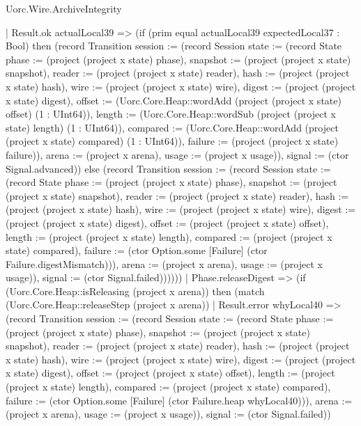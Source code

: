 \begin{lexlean}{Uorc.Wire.ArchiveIntegrity}
\begin{semanticmodule}
{          | Result.ok actualLocal39 => (if (prim equal actualLocal39 expectedLocal37 : Bool) then (record Transition {session := (record Session {state := (record State {phase := (project (project x state) phase), snapshot := (project (project x state) snapshot), reader := (project (project x state) reader), hash := (project (project x state) hash), wire := (project (project x state) wire), digest := (project (project x state) digest), offset := (Uorc.Core.Heap::wordAdd (project (project x state) offset) (1 : UInt64)), length := (Uorc.Core.Heap::wordSub (project (project x state) length) (1 : UInt64)), compared := (Uorc.Core.Heap::wordAdd (project (project x state) compared) (1 : UInt64)), failure := (project (project x state) failure)}), arena := (project x arena), usage := (project x usage)}), signal := (ctor Signal.advanced)}) else (record Transition {session := (record Session {state := (record State {phase := (project (project x state) phase), snapshot := (project (project x state) snapshot), reader := (project (project x state) reader), hash := (project (project x state) hash), wire := (project (project x state) wire), digest := (project (project x state) digest), offset := (project (project x state) offset), length := (project (project x state) length), compared := (project (project x state) compared), failure := (ctor Option.some [Failure] (ctor Failure.digestMismatch))}), arena := (project x arena), usage := (project x usage)}), signal := (ctor Signal.failed)})))))
      | Phase.releaseDigest => (if (Uorc.Core.Heap::isReleasing (project x arena)) then (match (Uorc.Core.Heap::releaseStep (project x arena))
        | Result.error whyLocal40 => (record Transition {session := (record Session {state := (record State {phase := (project (project x state) phase), snapshot := (project (project x state) snapshot), reader := (project (project x state) reader), hash := (project (project x state) hash), wire := (project (project x state) wire), digest := (project (project x state) digest), offset := (project (project x state) offset), length := (project (project x state) length), compared := (project (project x state) compared), failure := (ctor Option.some [Failure] (ctor Failure.heap whyLocal40))}), arena := (project x arena), usage := (project x usage)}), signal := (ctor Signal.failed)})
}
\end{semanticmodule}
\end{lexlean}
